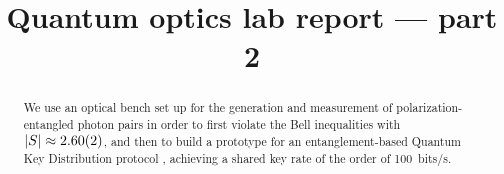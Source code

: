 \documentclass[11pt]{article}
\title{Quantum optics lab report --- part 2}
\begin{document}
\maketitle

\begin{abstract}
We use an optical bench set up for the generation and measurement of polarization-entangled photon pairs in order to first violate the Bell inequalities with \(\abs{S} \approx \num{2.60(2)}\), and then to build a prototype for an entanglement-based Quantum Key Distribution protocol \cite[]{bennettQuantumCryptographyBell1992}, achieving a shared key rate of the order of \SI{100}{bits/s}.
\end{abstract}





% 

\printbibliography
\end{document}
